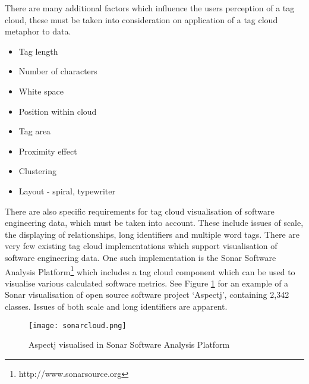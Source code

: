 
There are many additional factors which influence the users perception of a tag cloud, these must be taken into consideration on application of a tag cloud metaphor to data.

\begin{itemize}
	\item Tag length
	\item Number of characters
	\item White space
	\item Position within cloud
	\item Tag area
	\item Proximity effect
	\item Clustering
	\item Layout - spiral, typewriter
\end{itemize}

There are also specific requirements for tag cloud visualisation of software engineering data, which must be taken into account. These include issues of scale, the displaying of relationships, long identifiers and multiple word tags. There are very few existing tag cloud implementations which support visualisation of software engineering data. One such implementation is the Sonar Software Analysis Platform\footnote{http://www.sonarsource.org} which includes a tag cloud component which can be used to visualise various calculated software metrics. See Figure \ref{fig:sonarcloud} for an example of a Sonar visualisation of open source software project `Aspectj', containing 2,342 classes. Issues of both scale and long identifiers are apparent.  

\begin{figure}[h!]
	\centering
	\texttt{[image: sonarcloud.png]}
	\caption{Aspectj visualised in Sonar Software Analysis Platform}
	\label{fig:sonarcloud}
\end{figure}



